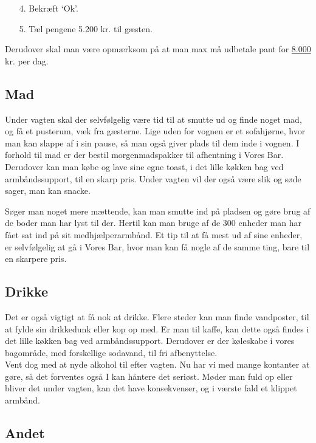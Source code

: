 \begin{enumerate}
  \item[4.] Bekræft `Ok'.
  \item[5.] Tæl pengene 5.200 kr. til gæsten.
\end{enumerate}

Derudover skal man være opmærksom på at man max må udbetale pant for \underline{8.000} kr. per dag.

\subsection{Mad}

Under vagten skal der selvfølgelig være tid til at smutte ud og finde noget mad, og få et 
pusterum, væk fra gæsterne. Lige uden for vognen er et sofahjørne, hvor man kan slappe af i 
sin pause, så man også giver plads til dem inde i vognen.
I forhold til mad er der bestil morgenmadspakker til afhentning i Vores Bar. 
Derudover kan man købe og lave sine egne toast, i det lille køkken bag ved armbåndssupport, 
til en skarp pris. Under vagten vil der også være slik og søde sager, man kan snacke.

Søger man noget mere mættende, kan man smutte ind på pladsen og gøre brug af de boder man har lyst til der.
Hertil kan man bruge af de 300 enheder man har fået sat ind på sit medhjælperarmbånd. Et tip til at få mest 
ud af sine enheder, er selvfølgelig at gå i Vores Bar, hvor man kan få nogle af de samme ting, bare til en 
skarpere pris.

\subsection{Drikke}

Det er også vigtigt at få nok at drikke.
Flere steder kan man finde vandposter, til at fylde sin drikkedunk eller kop op med.
Er man til kaffe, kan dette også findes i det lille køkken bag ved armbåndssupport.
Derudover er der køleskabe i vores bagområde, med forskellige sodavand, til fri 
afbenyttelse. \\

Vent dog med at nyde alkohol til efter vagten. Nu har vi med mange kontanter at gøre, 
så det forventes også I kan håntere det seriøst. 
Møder man fuld op eller bliver det under vagten, kan det have konsekvenser, og i 
værste fald et klippet armbånd.

\subsection{Andet}
\label{sec:intra:andet}

